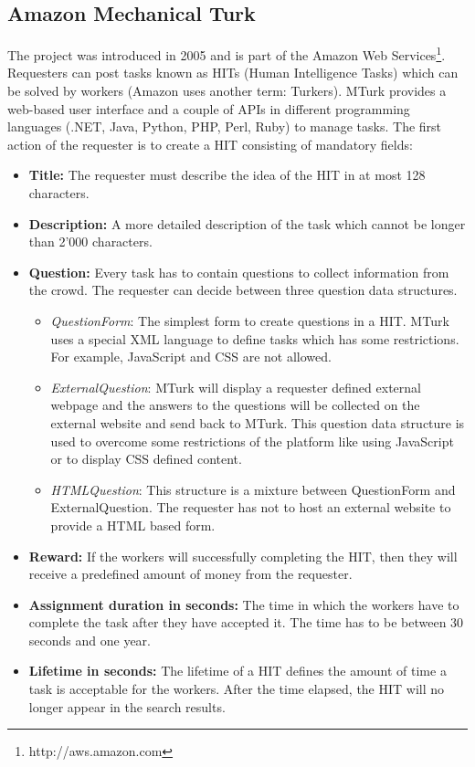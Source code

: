 \subsection{Amazon Mechanical Turk}
The project was introduced in 2005 and is part of the Amazon Web Services\footnote{http://aws.amazon.com}. Requesters can post tasks known as HITs (Human Intelligence Tasks) which can be solved by workers (Amazon uses another term: Turkers). MTurk provides a web-based user interface and a couple of APIs in different programming languages (.NET, Java, Python, PHP, Perl, Ruby) to manage tasks. The first action of the requester is to create a HIT consisting of mandatory fields: 
\begin{itemize}
	\item \textbf{Title:} The requester must describe the idea of the HIT in at most 128 characters. 
	\item \textbf{Description:} A more detailed description of the task which cannot be longer than 2'000 characters. 
	\item \textbf{Question:} Every task has to contain questions to collect information from the crowd. The requester can decide between three question data structures. 
	\begin{itemize}
		\item \textit{QuestionForm}: The simplest form to create questions in a HIT. MTurk uses a special XML language to define tasks which has some restrictions. For example, JavaScript and CSS are not allowed. 
		\item \textit{ExternalQuestion}: MTurk will display a requester defined external webpage and the answers to the questions will be collected on the external website and send back to MTurk. This question data structure is used to overcome some restrictions of the platform like using JavaScript or to display CSS defined content. 
		\item \textit{HTMLQuestion}: This structure is a mixture between QuestionForm and ExternalQuestion. The requester has not to host an external website to provide a HTML based form. 
	\end{itemize}
	\item \textbf{Reward:} If the workers will successfully completing the HIT, then they will receive a predefined amount of money from the requester. 
	\item \textbf{Assignment duration in seconds:} The time in which the workers have to complete the task after they have accepted it. The time has to be between 30 seconds and one year. 
	\item \textbf{Lifetime in seconds:} The lifetime of a HIT defines the amount of time a task is acceptable for the workers. After the time elapsed, the HIT will no longer appear in the search results.
\end{itemize}
